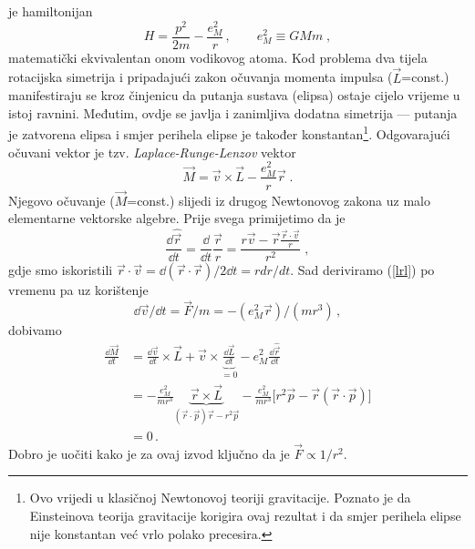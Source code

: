 je hamiltonijan
\begin{equation}
    H = \frac{p^2}{2m} - \frac{e_{M}^2}{r} \,,  \qquad 
 e_{M}^2 \equiv G M m \;,
\end{equation}
matematički ekvivalentan onom vodikovog atoma.
Kod problema dva tijela rotacijska simetrija i pripadajući zakon
očuvanja momenta impulsa ($\vec{L}$=const.) manifestiraju se kroz
činjenicu da putanja sustava (elipsa) ostaje cijelo vrijeme u istoj
ravnini.  
 
Međutim, ovdje se javlja i zanimljiva dodatna simetrija ---
putanja je zatvorena elipsa i
smjer perihela elipse je također konstantan\footnote{Ovo
vrijedi u klasičnoj Newtonovoj teoriji gravitacije. Poznato je da
Einsteinova teorija gravitacije korigira ovaj rezultat i da smjer perihela
elipse nije konstantan već vrlo polako precesira.}.
Odgovarajući očuvani vektor je tzv. \emph{Laplace-Runge-Lenzov}
vektor
\begin{equation}
  \vec{M} = \vec{v}\times\vec{L} - \frac{e_{M}^2}{r}\vec{r} \;.
\label{lrl}
\end{equation}
Njegovo očuvanje ($\vec{M}$=const.) slijedi iz drugog Newtonovog
zakona uz malo elementarne vektorske algebre.
Prije svega primijetimo da je
\begin{displaymath}
 \frac{\dd \hat{\vec{r}}}{\dd t} = \frac{\dd}{\dd t} \frac{\vec{r}}{r} =
 \frac{r \vec{v} - \vec{r}
\frac{\vec{r}\cdot\vec{v}}{r}}{r^2} \;,
\end{displaymath}
gdje smo iskoristili $\vec{r}\cdot\vec{v} = \dd (\vec{r}\cdot\vec{r})/2\dd t
= r dr/dt $.
Sad deriviramo (\ref{lrl}) po vremenu pa uz korištenje 
\[ \dd \vec{v}/ \dd t = \vec{F}/m = - (e_{M}^2 \vec{r})/(mr^3) \,, \]
dobivamo
\begin{displaymath}
\begin{split}
\frac{\dd \vec{M}}{\dd t} &=
\frac{\dd \vec{v}}{\dd t} \times \vec{L} + \vec{v}\times
\underbrace{\frac{\dd \vec{L}}{\dd t}}_{=0} - e_{M}^2 \frac{\dd \hat{\vec{r}}}
{\dd t} \\
&= -\frac{e_{M}^2}{mr^3} \underbrace{\vec{r}\times\vec{L}}_{(\vec{r}\cdot 
\vec{p})\vec{r} - r^2 \vec{p}} -
    \frac{e_{M}^2}{mr^3} \Big[ r^2\vec{p} - \vec{r}(\vec{r}\cdot\vec{p})\Big] \\
&= 0 \,.
\end{split}
\end{displaymath}
Dobro je uočiti kako je za ovaj izvod ključno da je $\vec{F}\propto 1/r^2$.
